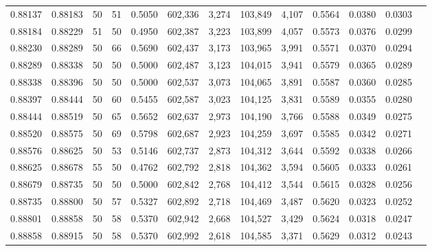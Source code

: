 \begin{tabular}{rrrrrrrrrrrrr}
0.88137 & 0.88183 &    50 &  51 &                                     0.5050 & 602,336 &   3,274 & 103,849 &   4,107 & 0.5564 & 0.0380 & 0.0303 \\
0.88184 & 0.88229 &    51 &  50 &                                     0.4950 & 602,387 &   3,223 & 103,899 &   4,057 & 0.5573 & 0.0376 & 0.0299 \\
0.88230 & 0.88289 &    50 &  66 &                                     0.5690 & 602,437 &   3,173 & 103,965 &   3,991 & 0.5571 & 0.0370 & 0.0294 \\
0.88289 & 0.88338 &    50 &  50 &                                     0.5000 & 602,487 &   3,123 & 104,015 &   3,941 & 0.5579 & 0.0365 & 0.0289 \\
0.88338 & 0.88396 &    50 &  50 &                                     0.5000 & 602,537 &   3,073 & 104,065 &   3,891 & 0.5587 & 0.0360 & 0.0285 \\
0.88397 & 0.88444 &    50 &  60 &                                     0.5455 & 602,587 &   3,023 & 104,125 &   3,831 & 0.5589 & 0.0355 & 0.0280 \\
0.88444 & 0.88519 &    50 &  65 &                                     0.5652 & 602,637 &   2,973 & 104,190 &   3,766 & 0.5588 & 0.0349 & 0.0275 \\
0.88520 & 0.88575 &    50 &  69 &                                     0.5798 & 602,687 &   2,923 & 104,259 &   3,697 & 0.5585 & 0.0342 & 0.0271 \\
0.88576 & 0.88625 &    50 &  53 &                                     0.5146 & 602,737 &   2,873 & 104,312 &   3,644 & 0.5592 & 0.0338 & 0.0266 \\
0.88625 & 0.88678 &    55 &  50 &                                     0.4762 & 602,792 &   2,818 & 104,362 &   3,594 & 0.5605 & 0.0333 & 0.0261 \\
0.88679 & 0.88735 &    50 &  50 &                                     0.5000 & 602,842 &   2,768 & 104,412 &   3,544 & 0.5615 & 0.0328 & 0.0256 \\
0.88735 & 0.88800 &    50 &  57 &                                     0.5327 & 602,892 &   2,718 & 104,469 &   3,487 & 0.5620 & 0.0323 & 0.0252 \\
0.88801 & 0.88858 &    50 &  58 &                                     0.5370 & 602,942 &   2,668 & 104,527 &   3,429 & 0.5624 & 0.0318 & 0.0247 \\
0.88858 & 0.88915 &    50 &  58 &                                     0.5370 & 602,992 &   2,618 & 104,585 &   3,371 & 0.5629 & 0.0312 & 0.0243 \\

\end{tabular}

